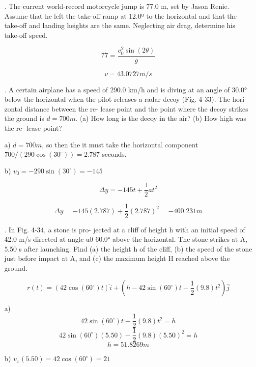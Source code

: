 \documentclass{scrreprt} %
\begin{document}
. The current world-record motorcycle jump is 77.0 m,
set  by  Jason  Renie. Assume  that he  left  the  take-off  ramp  at  
12.0º to the horizontal and that the take-off and landing 
heights are the same. Neglecting air drag, determine his take-off
speed.

$$77=\frac{v_0^2\sin(2\theta)}{g}$$

$$\boxed{v = 43.0727 m/s}$$

. A certain airplane has a
speed  of  290.0 km/h  and  is  diving
at  an  angle  of 30.0° below  the
horizontal  when  the pilot  releases
a radar decoy (Fig. 4-33). The hori-
zontal distance between the re-
lease  point  and  the  point  where
the decoy strikes the ground is $d =
700 m$. (a) How long is the decoy in
the  air?  (b)  How  high  was  the  re-
lease point?

a) $d = 700m$, so then the it must take the horizontal component
$700/(290\cos(30^\circ))=\boxed{2.787}$ seconds.

b) $v_0 = -290\sin(30^\circ) = -145$

$$\Delta y = -145t + \frac{1}{2}at^2$$

$$\Delta y = -145(2.787) + \frac{1}{2}(2.787)^2 = \boxed{-400.231 m}$$

. In Fig. 4-34, a stone is pro-
jected at a cliff of height h with an initial speed of 42.0 m/s directed
at  angle  u0 60.0° above  the  horizontal. The  stone  strikes  at  A,
5.50 s  after  launching. Find  (a)  the  height  h of  the  cliff, (b)  the
speed of the stone just before impact at A, and (c) the maximum
height H reached above the ground.

$$r(t) = (42\cos(60^\circ)t)\hat{i} + (h - 42\sin(60^\circ)t - \frac{1}{2}(9.8)t^2)\hat{j}$$

a)  $$42\sin(60^\circ)t - \frac{1}{2}(9.8)t^2 = h$$
	$$42\sin(60^\circ)(5.50) - \frac{1}{2}(9.8)(5.50)^2 = h$$
	$$\boxed{h = 51.8269 m}$$

b) $v_x(5.50) = 42\cos(60^\circ) = 21$
\end{document}
